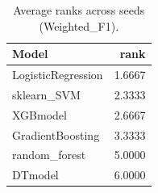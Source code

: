 \begin{table}[t]
\centering
\begin{tabular}{lr}
\toprule
Model & rank \\
\midrule
LogisticRegression & 1.6667 \\
sklearn_SVM & 2.3333 \\
XGBmodel & 2.6667 \\
GradientBoosting & 3.3333 \\
random_forest & 5.0000 \\
DTmodel & 6.0000 \\
\bottomrule
\end{tabular}
\caption{Average ranks across seeds (Weighted_F1).}
\label{tab:avg_rank_Weighted_F1}
\end{table}